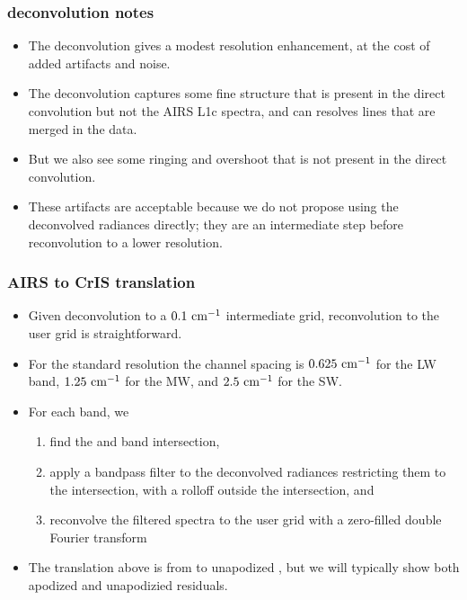 \documentclass[10pt]{beamer}
\begin{document}
\begin{frame}
\frametitle{deconvolution notes}
\begin{itemize}

  \item The {\airs} deconvolution gives a modest resolution
    enhancement, at the cost of added artifacts and noise.

  \item The deconvolution captures some fine structure that is
    present in the direct convolution but not the AIRS L1c spectra,
    and can resolves lines that are merged in the {\airs} data.

  \item But we also see some ringing and overshoot that is not
    present in the direct convolution.

  \item These artifacts are acceptable because we do not propose
    using the deconvolved radiances directly; they are an
    intermediate step before reconvolution to a lower resolution.

\end{itemize}
\end{frame}
\begin{frame}
\frametitle{AIRS to CrIS translation}
\begin{itemize}

  \item Given {\airs} deconvolution to a $0.1~\mbox{cm$^{-1}$}$ intermediate
    grid, reconvolution to the {\cris} user grid is straightforward.

  \item For the {\cris} standard resolution the channel spacing is
    $0.625~\mbox{cm$^{-1}$}$ for the LW band, $1.25~\mbox{cm$^{-1}$}$ for the MW, and
    $2.5~\mbox{cm$^{-1}$}$ for the SW.

  \item For each {\cris} band, we 
    \begin{enumerate}
       \item find the {\airs} and {\cris} band intersection, 
       \item apply a bandpass filter to the deconvolved {\airs}
         radiances restricting them to the intersection, with a
         rolloff outside the intersection, and
       \item reconvolve the filtered spectra to the {\cris} user
         grid with a zero-filled double Fourier transform
    \end{enumerate}

  \item The translation above is from {\airs} to unapodized {\cris},
    but we will typically show both apodized and unapodizied residuals.

\end{itemize}
\end{frame}
\end{document}

